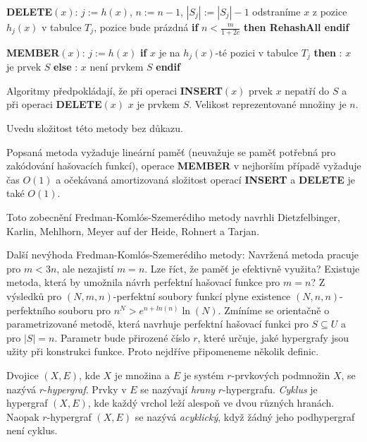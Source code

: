 \documentclass[a4paper,12pt]{article}
\begin{document}
{\bf DELETE$(x)$}:\newline 
$j:=h(x)$, $n:=n-1$, $|S_j|:=|S_j|-1$\newline 
odstraníme $x$ z pozice $h_j(x)$ v tabulce $T_j$, pozice bude prázdná \newline 
{\bf if} $n<\frac m{1+2c}$ {\bf then RehashAll endif}


{\bf MEMBER$(x)$}: \newline 
$j:=h(x)$\newline 
{\bf if} $x$ je na $h_j(x)$-té pozici v tabulce $T_j$ {\bf then}\newline 
\phantom{---}{\bf Výstup}: $x$ je prvek $S$ \newline 
{\bf else}\newline 
\phantom{---}{\bf Výstup}: $x$ není prvkem $S$\newline 
{\bf endif}


Algoritmy předpokládají, že při operaci {\bf INSERT$
(x)$} prvek $x$ nepatří do $S$ a při operaci {\bf DELETE$(x)$} $
x$ je prvkem $S$. Velikost reprezentované množiny je $n$. 

Uvedu složitost této metody bez důkazu.

\begin{veta}Popsaná metoda vyžaduje lineární paměť 
(neuvažuje se paměť potřebná pro zakódo\-vá\-ní hašovacích funkcí), operace {\bf MEMBER }
v nej\-horším případě vyžaduje čas $O(1)$ a očekávaná 
amortizovaná složitost operací {\bf INSERT} a {\bf DELETE} je také $
O(1)$.
\end{veta}

Toto zobecnění Fredman-Komlós-Szemerédiho metody navrhli 
Dietzfelbinger, Karlin, Mehl\-horn, Meyer auf der Heide, Rohnert 
a Tarjan.


Další nevýhoda Fredman-Komlós-Szemerédiho metody:\newline 
Navržená metoda pracuje pro $m<3n$, ale nezajistí $m=n$. 
Lze říct, že paměť je efektivně využita? Existuje 
metoda, která by umožnila návrh perfektní hašovací 
funkce pro $m=n$? Z výsledků pro 
$(N,m,n)$-perfektní soubory funkcí plyne existence 
$(N,n,n)$-perfektního souboru pro $n^N>e^{n+ln(n)}\ln(N)$. 
Zmíníme se orientačně o parametrizované metodě, která 
navr\-huje perfektní hašovací funkci pro $S\subseteq U$ a pro 
$|S|=n$. Parametr bude přirozené číslo $r$, které určuje, 
jaké hypergrafy jsou užity při konstrukci funkce. Proto 
nejdříve připomeneme několik definic.

Dvojice $(X,E)$, kde $X$ je množina a $E$ je systém 
$r$-prvkových podmnožin $X$, se nazývá $r$-\emph{hypergraf}.  
Prvky v $E$ se nazývají \emph{hrany} $r$-hypergrafu.  
\emph{Cyklus} je hypergraf $(X,E)$, kde každý vrchol leží 
alespoň ve dvou různých hranách.  Naopak 
$r$-hypergraf $(X,E)$ se nazývá \emph{acyklický}, když 
žádný jeho podhypergraf není cyklus.  
\end{document}
